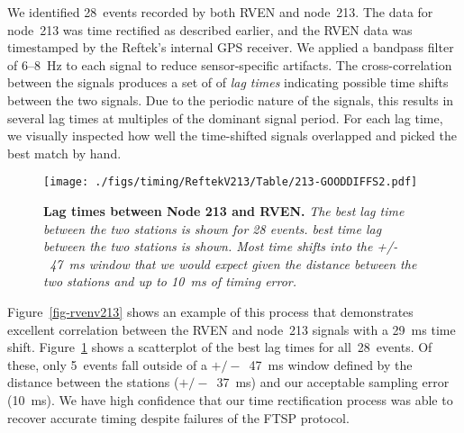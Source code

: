 We identified 28~events recorded by both RVEN and node~213.  The data for
node~213 was time rectified as described earlier, and the RVEN data was
timestamped by the Reftek's internal GPS receiver.  We applied a bandpass
filter of 6--8~Hz to each signal to reduce sensor-specific artifacts. The
cross-correlation between the signals produces a set of
of {\em lag times} indicating possible time shifts between the two signals.
Due to the periodic nature of the signals, this results in
several lag times at multiples of the dominant signal period. For each lag
time, we visually inspected how well the time-shifted signals overlapped and
picked the best match by hand.


\begin{figure}[t]
\begin{center}
\texttt{[image: ./figs/timing/ReftekV213/Table/213-GOODDIFFS2.pdf]}
\end{center}
\caption{\small{\bf Lag times between Node 213 and RVEN.}
{\em The best lag time between the two stations is shown for 28 events.  best
time lag between the two stations is shown.  Most time shifts into the
+/-~47~ms window that we would expect given the distance between the two
stations and up to 10~ms of timing error.}}
\label{fig-rvenv213all}
\end{figure}

Figure~\ref{fig-rvenv213} shows an example of this process that demonstrates
excellent correlation between the RVEN and node~213 signals with a 29~ms time
shift. Figure~\ref{fig-rvenv213all} shows a scatterplot of the best lag times
for all~28~events.  Of these, only 5~events fall outside of a $+/-$~47~ms
window defined by the distance between the stations ($+/-$~37~ms) and our
acceptable sampling error (10~ms). We have high confidence that our
time rectification process was able to recover accurate timing despite
failures of the FTSP protocol.


